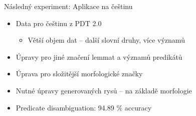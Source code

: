 \documentclass[hyperref={unicode=true}]{beamer}
\begin{document}
\begin{frame}{Následný experiment: Aplikace na češtinu}
    \begin{itemize}
        \item Data pro češtinu z PDT 2.0
        \begin{itemize}\item Větší objem dat -- další slovní druhy, více významů\end{itemize}
        \item Úpravy pro jiné značení lemmat a významů predikátů  
        \item Úprava pro složitější morfologické značky
        \item Nutné úpravy generovaných rysů -- na základě morfologie
        \item Predicate disambiguation: 94.89 \% accuracy
    \end{itemize}    
\end{frame}
\end{document}
